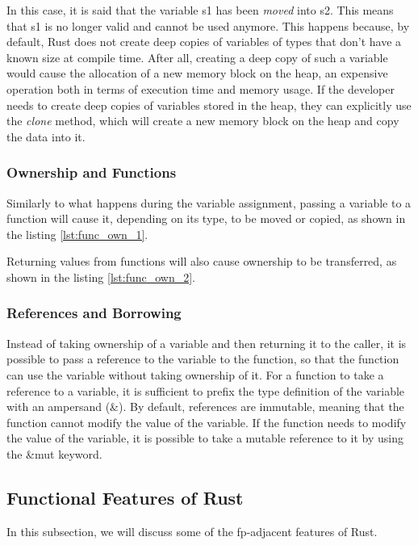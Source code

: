 In this case, it is said that the variable s1 has been \textit{moved} into s2. This means that s1 is no longer valid and cannot be used anymore.
This happens because, by default, Rust does not create deep copies of variables of types that don't have a known size at compile time. After all, creating a deep copy of such
a variable would cause the allocation of a new memory block on the heap, an expensive operation both in terms of execution time and memory usage. If the developer
needs to create deep copies of variables stored in the heap, they can explicitly use the \textit{clone} method, which will create a new memory block on the heap and copy the data into it.

\subsubsection{Ownership and Functions}
Similarly to what happens during the variable assignment, passing a variable to a function will cause it, depending on its type, to be moved or copied, as shown in the listing \ref{lst:func_own_1}.



Returning values from functions will also cause ownership to be transferred, as shown in the listing \ref{lst:func_own_2}.



\subsubsection{References and Borrowing}
Instead of taking ownership of a variable and then returning it to the caller, it is possible to pass a reference to the variable to the function, so that the function can use the variable without taking ownership of it.
For a function to take a reference to a variable, it is sufficient to prefix the type definition of the variable with an ampersand (\&).
By default, references are immutable, meaning that the function cannot modify the value of the variable. If the function needs to modify the value of the variable, it is possible to take a mutable reference to it by using the \&mut keyword.

\subsection{Functional Features of Rust}
In this subsection, we will discuss some of the \ac{fp}-adjacent features of Rust.

